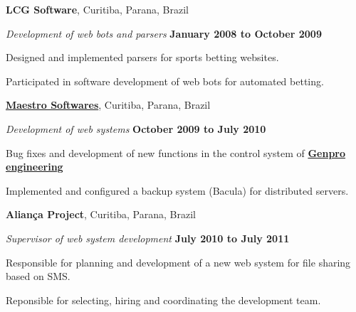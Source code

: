 \documentclass[10pt]{article}
\newenvironment{outerlist}[1][\enskip\textbullet]%
        {\begin{itemize}[#1]}{\end{itemize}%
         \vspace{-.6\baselineskip}}
\newenvironment{innerlist}[1][\enskip\textbullet]%
        {\begin{compactitem}[#1]}{\end{compactitem}}
\newcommand{\blankline}{\quad\pagebreak[2]}
\begin{document}
\textbf{LCG Software},
Curitiba, Parana, Brazil
\begin{outerlist}

\item[] \textit{Development of web bots and parsers}%
        \hfill \textbf{January 2008 to October 2009}
\begin{innerlist}
\item Designed and implemented parsers for sports betting websites.
\item Participated in software development of web bots for automated
  betting.
\end{innerlist}

\end{outerlist}

\blankline

\href{http://www.maestrosoft.com.br/}{\textbf{Maestro Softwares}},
Curitiba, Parana, Brazil
\begin{outerlist}

\item[] \textit{Development of web systems}%
        \hfill \textbf{October 2009 to July 2010}
\begin{innerlist}
\item Bug fixes and development of new functions in the control system
  of \href{http://www.genpro.com.br/}{\textbf{Genpro engineering}}
\item Implemented and configured a backup system (Bacula) for
  distributed servers.
\end{innerlist}

\end{outerlist}

\blankline

\textbf{Alian\c{c}a Project},
Curitiba, Parana, Brazil
\begin{outerlist}

\item[] \textit{Supervisor of web system development}%
        \hfill \textbf{July 2010 to July 2011}
\begin{innerlist}
\item Responsible for planning and development of a new web system for file sharing based on SMS.
\item Reponsible for selecting, hiring and coordinating the development team.
\end{innerlist}

\end{outerlist}

\blankline
\end{document}

